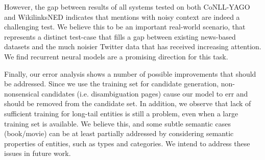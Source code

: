 \documentclass[11pt,a4paper]{article}
\begin{document}
	However, the gap between results of all systems tested on both CoNLL-YAGO and WikilinksNED indicates that mentions with noisy context are indeed a challenging test. We believe this to be an important real-world scenario, that represents a distinct test-case that fills a gap between existing news-based datasets and the much noisier Twitter data \cite{ritter2011Named} that has received increasing attention. We find recurrent neural models are a promising direction for this task. 
	
	Finally, our error analysis shows a number of possible improvements that should be addressed. Since we use the training set for candidate generation, non-nonsensical candidates (i.e. disambiguation pages) cause our model to err and should be removed from the candidate set. In addition, we observe that lack of sufficient training for long-tail entities is still a problem, even when a large training set is available. We believe this, and some subtle semantic cases (book/movie) can be at least partially addressed by considering semantic properties of entities, such as types and categories. We intend to address these issues in future work.
	
	
	
	
\end{document}
